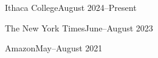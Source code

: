   {Ithaca College}{August 2024--Present}{}{}
  
  {The New York Times}{June--August 2023}{}{}

  {Amazon}{May--August 2021}{}{}
